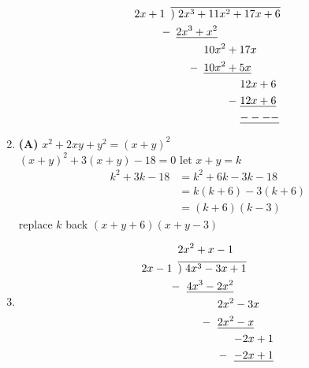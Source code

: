 \begin{multicols}{2}
\begin{enumerate}[label={\textbf{\arabic*.}}]
\begin{align*}
            2x + 1 \hspace{5pt} & \overline{) \hspace{3pt} 2x^3 + 11x^2 + 17x + 6} \\
            - & \hspace{5pt} \underline{2x^3 + x^2} \\
            & \hspace{30pt} 10x^2 + 17x \\
            - \hspace{-25pt} & \hspace{30pt} \underline{10x^2 + 5x} \\
            & \hspace{63pt} 12x + 6 \\
            - \hspace{-60pt} & \hspace{63pt} \underline{12x + 6} \\
            & \hspace{63pt} \underline{----}
        \end{align*}    
\item \textbf{(A)} \( x^2 + 2xy + y^2 = (x+y)^2 \) \\
    \( (x+y)^2 + 3(x+y) - 18 = 0 \) let \( x+y = k \) 
    \begin{align*}
    k^2 + 3k - 18 &= k^2 + 6k - 3k - 18 \\
    &= k(k+6) - 3(k+6) \\
    &= (k+6)(k-3)
    \end{align*}
    replace \( k \) back \( (x+y+6)(x+y-3) \)
\item 
    \begin{align*}
        & 2x^2 + x - 1  \\
        2x - 1 \hspace{5pt} & \overline{)\hspace{3pt} 4x^3 - 3x + 1} \\
        -\hspace{-2pt} & \hspace{8pt} \underline{4x^3 - 2x^2} \\
        & \hspace{36pt} 2x^2 - 3x \\
        -\hspace{-30pt} & \hspace{36pt} \underline{2x^2 - x} \\
        & \hspace{51pt} {-2x + 1} \\
        -\hspace{-45pt} & \hspace{51pt} \underline{-2x + 1} \\

\end{align*}
\end{enumerate}
\end{multicols}
